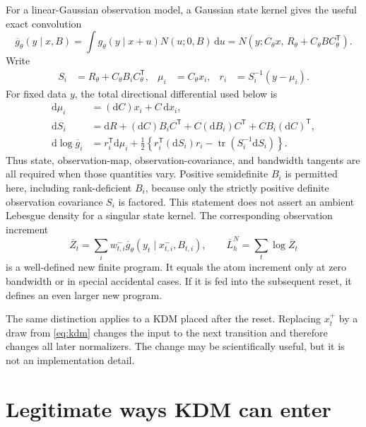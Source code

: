\documentclass[11pt]{article}
\newcommand{\dd}{\mathrm{d}}
\begin{document}
For a linear-Gaussian observation model, a Gaussian state kernel gives the
useful exact convolution
\begin{equation}
 \overline g_\theta(y\mid x,B)
 = \int g_\theta(y\mid x+u)N(u;0,B)\,\dd u
 = N\!\left(y;C_\theta x,\,
       R_\theta+C_\theta B C_\theta^\mathsf{T}\right).
 \label{eq:linear-convolution}
\end{equation}
Write
\begin{align}
 S_i &= R_\theta+C_\theta B_i C_\theta^\mathsf{T}, &
 \mu_i &= C_\theta x_i, &
 r_i &= S_i^{-1}(y-\mu_i).
\end{align}
For fixed data $y$, the total directional differential used below is
\begin{align}
 \dd\mu_i
   &= (\dd C)x_i+C\,\dd x_i,\\
 \dd S_i
   &= \dd R+(\dd C)B_iC^\mathsf{T}
      +C(\dd B_i)C^\mathsf{T}+CB_i(\dd C)^\mathsf{T},\\
 \dd\log \overline g_i
   &=r_i^\mathsf{T}\dd\mu_i
     +\frac12\left\{
       r_i^\mathsf{T}(\dd S_i)r_i
       -\operatorname{tr}(S_i^{-1}\dd S_i)
     \right\}.
 \label{eq:linear-convolution-tangent}
\end{align}
Thus state, observation-map, observation-covariance, and bandwidth tangents
are all required when those quantities vary.  Positive semidefinite $B_i$ is
permitted here, including rank-deficient $B_i$, because only the strictly
positive definite observation covariance $S_i$ is factored.  This statement
does not assert an ambient Lebesgue density for a singular state kernel.
The corresponding observation increment
\begin{equation}
 \overline Z_t
 =\sum_i w_{t,i}^{-}\overline g_\theta(y_t\mid x_{t,i}^{-},B_{t,i}),
 \qquad
 \overline L_h^N=\sum_t\log\overline Z_t
 \label{eq:smoothed-value}
\end{equation}
is a well-defined new finite program.  It equals the atom increment only at
zero bandwidth or in special accidental cases.  If it is fed into the
subsequent reset, it defines an even larger new program.

The same distinction applies to a KDM placed after the reset.  Replacing
$x_t^+$ by a draw from \eqref{eq:kdm} changes the input to the next
transition and therefore changes all later normalizers.  The change may be
scientifically useful, but it is not an implementation detail.

\section{Legitimate ways KDM can enter}
\end{document}
